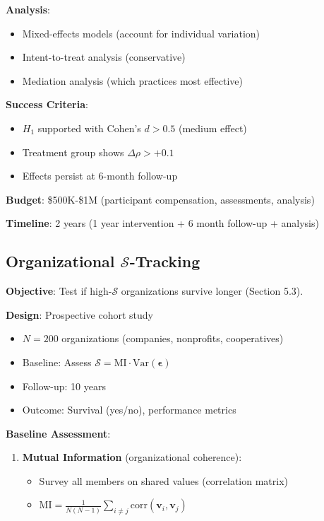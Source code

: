 \documentclass[11pt,a4paper]{article}
\theoremstyle{definition}
\theoremstyle{remark}
\begin{document}
\begin{enumerate}
\begin{protocol}
\textbf{Analysis}:
\begin{itemize}
    \item Mixed-effects models (account for individual variation)
    \item Intent-to-treat analysis (conservative)
    \item Mediation analysis (which practices most effective)
\end{itemize}

\textbf{Success Criteria}:
\begin{itemize}
    \item \(H_1\) supported with Cohen's \(d > 0.5\) (medium effect)
    \item Treatment group shows \(\Delta\rho > +0.1\)
    \item Effects persist at 6-month follow-up
\end{itemize}

\textbf{Budget}: \$500K-\$1M (participant compensation, assessments, analysis)

\textbf{Timeline}: 2 years (1 year intervention + 6 month follow-up + analysis)
\end{protocol}

\subsection{Organizational \(\mathcal{S}\)-Tracking}

\begin{protocol}
\textbf{Objective}: Test if high-\(\mathcal{S}\) organizations survive longer (Section 5.3).

\textbf{Design}: Prospective cohort study
\begin{itemize}
    \item \(N = 200\) organizations (companies, nonprofits, cooperatives)
    \item Baseline: Assess \(\mathcal{S} = \text{MI} \cdot \text{Var}(\boldsymbol{\epsilon})\)
    \item Follow-up: 10 years
    \item Outcome: Survival (yes/no), performance metrics
\end{itemize}

\textbf{Baseline Assessment}:
\begin{enumerate}
    \item \textbf{Mutual Information} (organizational coherence):
        \begin{itemize}
            \item Survey all members on shared values (correlation matrix)
            \item \(\text{MI} = \frac{1}{N(N-1)}\sum_{i \neq j} \text{corr}(\mathbf{v}_i, \mathbf{v}_j)\)
        \end{itemize}
    

\end{enumerate}
\end{protocol}
\end{enumerate}
\end{document}
